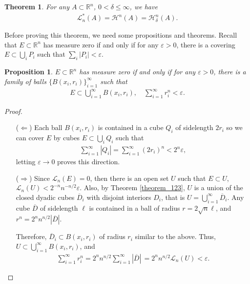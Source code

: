\documentclass[11pt]{book}
\newtheorem{theorem}{Theorem}[chapter]
\newtheorem{proposition}{Proposition}[chapter]
\theoremstyle{definition}
\numberwithin{equation}{chapter}
\def\H{{\mathcal H}}
\def\L{{\mathcal L}}
\begin{document}
\medskip

\begin{theorem}\label{theorem_129}
For any $A \subset \mathbb{R}^n$, $0 < \delta \leq \infty$, we have
\begin{align*}
    \L_n^*(A) = \H^n(A) = \H^n_{\delta} (A).
\end{align*}
\end{theorem}

\medskip

Before proving this theorem, we need some propositions and theorems. Recall that $E \subset \mathbb{R}^n$ has measure zero if and only if for any $\varepsilon > 0$, there is a covering $E \subset \bigcup_i P_i$ such that $\sum_i \left|P_i\right| < \varepsilon$.

\medskip

\begin{proposition}\label{prop_18}
$E \subset \mathbb{R}^n$ has measure zero if and only if for any $\varepsilon > 0$, there is a family of balls $\{B(x_i,r_i)\}^\infty_{i=1}$ such that
\begin{align*}
    E \subset \bigcup^\infty_{i=1} B(x_i,r_i), \quad \sum^\infty_{i=1} r_i^n < \varepsilon.
\end{align*}
\end{proposition}
\begin{proof}
~\begin{enumerate}
    \item[($\Leftarrow$)] Each ball $B(x_i,r_i)$ is contained in a cube $Q_i$ of sidelength $2r_i$ so we can cover $E$ by cubes $E \subset \bigcup_i Q_i$ such that
    \begin{align*}
        \sum^\infty_{i=1} \left|Q_i\right| = \sum^\infty_{i=1} (2r_i)^n < 2^n \varepsilon,
    \end{align*}
    letting $\varepsilon \to 0$ proves this direction.
    
    \item[($\Rightarrow$)] Since $\L_n(E) = 0$, then there is an open set $U$ such that $E \subset U$, $\L_n(U) < 2^{-n}n^{-n/2} \varepsilon$. Also, by Theorem \ref{theorem_123}, $U$ is a union of the closed dyadic cubes $\overline{D}_i$ with disjoint interiors $D_i$, that is $U = \bigcup^\infty_{i=1} \overline{D}_i$. Any cube $\overline{D}$ of sidelength $\ell$ is contained in a ball of radius $r = 2\sqrt{n}\ell$\cite{17}, and $r^n = 2^nn^{n/2}|\overline{D}|$. 
    
    Therefore, $\overline{D}_i \subset B(x_i,r_i)$ of radius $r_i$ similar to the above. Thus, $U \subset \bigcup^\infty_{i=1} B(x_i,r_i)$, and
    \begin{align*}
        \sum^\infty_{i=1} r_i^n = 2^nn^{n/2} \sum^\infty_{i=1} |\overline{D}|\, = 2^nn^{n/2} \L_n(U) < \varepsilon.
    \end{align*}
\end{enumerate}
\end{proof}
\end{document}
